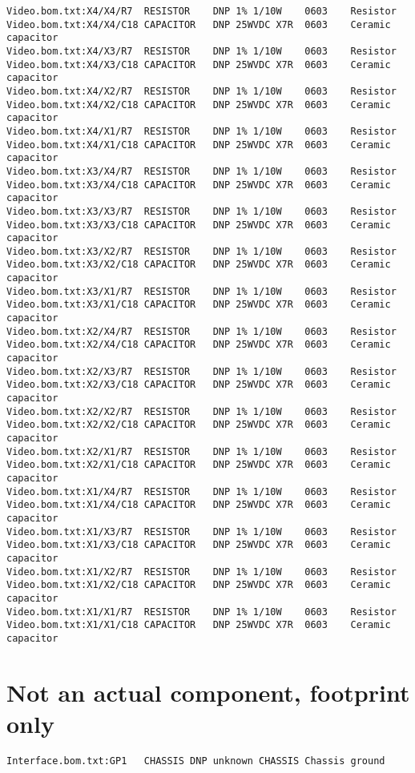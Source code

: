 \documentclass[11pt]{article}
\begin{document}
\begin{verbatim}
Video.bom.txt:X4/X4/R7	RESISTOR	DNP	1% 1/10W	0603	Resistor	
Video.bom.txt:X4/X4/C18	CAPACITOR	DNP	25WVDC X7R	0603	Ceramic capacitor	
Video.bom.txt:X4/X3/R7	RESISTOR	DNP	1% 1/10W	0603	Resistor	
Video.bom.txt:X4/X3/C18	CAPACITOR	DNP	25WVDC X7R	0603	Ceramic capacitor	
Video.bom.txt:X4/X2/R7	RESISTOR	DNP	1% 1/10W	0603	Resistor	
Video.bom.txt:X4/X2/C18	CAPACITOR	DNP	25WVDC X7R	0603	Ceramic capacitor	
Video.bom.txt:X4/X1/R7	RESISTOR	DNP	1% 1/10W	0603	Resistor	
Video.bom.txt:X4/X1/C18	CAPACITOR	DNP	25WVDC X7R	0603	Ceramic capacitor	
Video.bom.txt:X3/X4/R7	RESISTOR	DNP	1% 1/10W	0603	Resistor	
Video.bom.txt:X3/X4/C18	CAPACITOR	DNP	25WVDC X7R	0603	Ceramic capacitor	
Video.bom.txt:X3/X3/R7	RESISTOR	DNP	1% 1/10W	0603	Resistor	
Video.bom.txt:X3/X3/C18	CAPACITOR	DNP	25WVDC X7R	0603	Ceramic capacitor	
Video.bom.txt:X3/X2/R7	RESISTOR	DNP	1% 1/10W	0603	Resistor	
Video.bom.txt:X3/X2/C18	CAPACITOR	DNP	25WVDC X7R	0603	Ceramic capacitor	
Video.bom.txt:X3/X1/R7	RESISTOR	DNP	1% 1/10W	0603	Resistor	
Video.bom.txt:X3/X1/C18	CAPACITOR	DNP	25WVDC X7R	0603	Ceramic capacitor	
Video.bom.txt:X2/X4/R7	RESISTOR	DNP	1% 1/10W	0603	Resistor	
Video.bom.txt:X2/X4/C18	CAPACITOR	DNP	25WVDC X7R	0603	Ceramic capacitor	
Video.bom.txt:X2/X3/R7	RESISTOR	DNP	1% 1/10W	0603	Resistor	
Video.bom.txt:X2/X3/C18	CAPACITOR	DNP	25WVDC X7R	0603	Ceramic capacitor	
Video.bom.txt:X2/X2/R7	RESISTOR	DNP	1% 1/10W	0603	Resistor	
Video.bom.txt:X2/X2/C18	CAPACITOR	DNP	25WVDC X7R	0603	Ceramic capacitor	
Video.bom.txt:X2/X1/R7	RESISTOR	DNP	1% 1/10W	0603	Resistor	
Video.bom.txt:X2/X1/C18	CAPACITOR	DNP	25WVDC X7R	0603	Ceramic capacitor	
Video.bom.txt:X1/X4/R7	RESISTOR	DNP	1% 1/10W	0603	Resistor	
Video.bom.txt:X1/X4/C18	CAPACITOR	DNP	25WVDC X7R	0603	Ceramic capacitor	
Video.bom.txt:X1/X3/R7	RESISTOR	DNP	1% 1/10W	0603	Resistor	
Video.bom.txt:X1/X3/C18	CAPACITOR	DNP	25WVDC X7R	0603	Ceramic capacitor	
Video.bom.txt:X1/X2/R7	RESISTOR	DNP	1% 1/10W	0603	Resistor	
Video.bom.txt:X1/X2/C18	CAPACITOR	DNP	25WVDC X7R	0603	Ceramic capacitor	
Video.bom.txt:X1/X1/R7	RESISTOR	DNP	1% 1/10W	0603	Resistor	
Video.bom.txt:X1/X1/C18	CAPACITOR	DNP	25WVDC X7R	0603	Ceramic capacitor	
\end{verbatim}

\section{Not an actual component, footprint only}

\begin{verbatim}
Interface.bom.txt:GP1	CHASSIS	DNP	unknown	CHASSIS	Chassis ground	
\end{verbatim}



 
\end{document}
